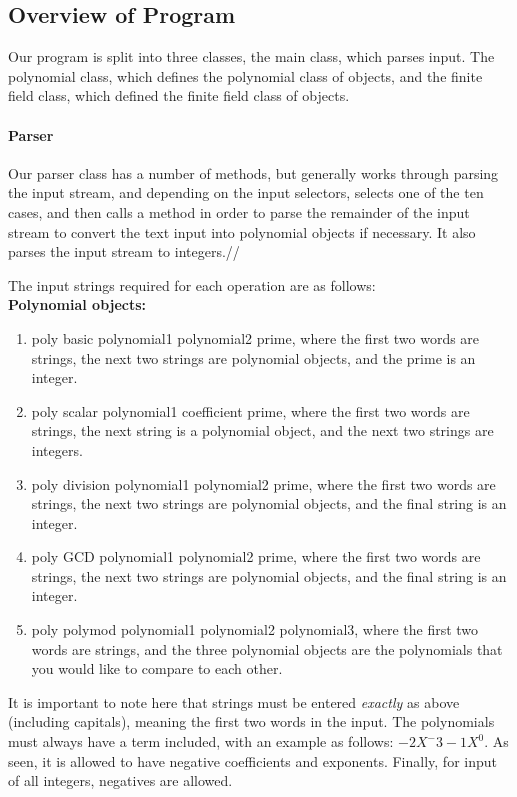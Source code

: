 \documentclass[
10pt, %
a4paper, %
oneside, %
headinclude,footinclude, %
BCOR5mm, %
]{scrartcl}
\begin{document}
\subsection{Overview of Program}

Our program is split into three classes, the main class, which parses input. The polynomial class, which defines the polynomial class of objects, and the finite field class, which defined the finite field class of objects.

\paragraph{Parser}
Our parser class has a number of methods, but generally works through parsing the input stream, and depending on the input selectors, selects one of the ten cases, and then calls a method in order to parse the remainder of the input stream to convert the text input into polynomial objects if necessary. It also parses the input stream to integers.//

The input strings required for each operation are as follows:\\
\textbf{Polynomial objects:}
\begin{enumerate}[noitemsep]
\item poly basic polynomial1 polynomial2 prime, where the first two words are strings, the next two strings are polynomial objects, and the prime is an integer.

\item poly scalar polynomial1 coefficient prime, where the first two words are strings, the next string is a polynomial object, and the next two strings are integers.

\item poly division polynomial1 polynomial2 prime, where the first two words are strings, the next two strings are polynomial objects, and the final string is an integer.

\item poly GCD polynomial1 polynomial2 prime, where the first two words are strings, the next two strings are polynomial objects, and the final string is an integer.

\item poly polymod polynomial1 polynomial2 polynomial3, where the first two words are strings, and the three polynomial objects are the polynomials that you would like to compare to each other.
\end{enumerate}

It is important to note here that strings must be entered \textit{exactly} as above (including capitals), meaning the first two words in the input. The polynomials must always have a term included, with an example as follows: $-2X^-3 -1X^0$. As seen, it is allowed to have negative coefficients and exponents. Finally, for input of all integers, negatives are allowed.\\
\end{document}
